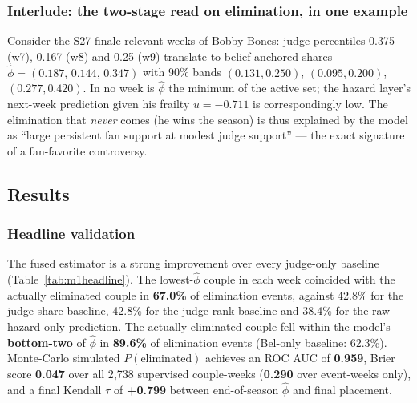 \documentclass[10pt]{article}
\begin{document}
\subsubsection{Interlude: the two-stage read on elimination, in one example}

Consider the S27 finale-relevant weeks of Bobby Bones: judge percentiles 0.375 (w7), 0.167
(w8) and 0.25 (w9) translate to belief-anchored shares $\hat\phi = (0.187,\,0.144,\,0.347)$
with 90\% bands $(0.131,0.250)$, $(0.095,0.200)$, $(0.277,0.420)$. In no week is
$\hat\phi$ the minimum of the active set; the hazard layer's next-week prediction given his
frailty $u=-0.711$ is correspondingly low. The elimination that \emph{never} comes
(he wins the season) is thus explained by the model as ``large persistent fan support at
modest judge support'' --- the exact signature of a fan-favorite controversy.

\subsection{Results}\label{sec:m1res}

\subsubsection{Headline validation}

The fused estimator is a strong improvement over every judge-only baseline
(Table~\ref{tab:m1headline}). The lowest-$\hat\phi$ couple in each week coincided with the
actually eliminated couple in \textbf{67.0\%} of elimination events, against 42.8\% for
the judge-share baseline, 42.8\% for the judge-rank baseline and 38.4\% for the raw
hazard-only prediction. The actually eliminated couple fell within the model's
\textbf{bottom-two} of $\hat\phi$ in \textbf{89.6\%} of elimination events (Bel-only
baseline: 62.3\%). Monte-Carlo simulated $P(\text{eliminated})$ achieves an ROC AUC of
\textbf{0.959}, Brier score \textbf{0.047} over all 2{,}738 supervised couple-weeks
(\textbf{0.290} over event-weeks only), and a final Kendall $\tau$ of \textbf{+0.799}
between end-of-season $\hat\phi$ and final placement.
\end{document}
